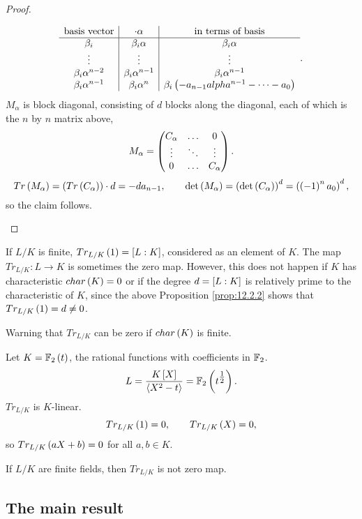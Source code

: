 \begin{proof}
\begin{itemize}
$$
\begin{array}{c|c|c}
\text{basis vector} & \cdot \alpha & \text{in terms of basis} \\
\hline
\beta_i & \beta_i\alpha & \beta_i\alpha \\
\vdots & \vdots & \vdots \\
\beta_i\alpha^{n - 2} & \beta_i\alpha^{n - 1} & \beta_i\alpha^{n - 1} \\
\beta_i\alpha^{n - 1} & \beta_i\alpha^n & \beta_i\rb{-a_{n - 1}alpha^{n - 1} - \dots - a_0} \\
\end{array}.
$$
$ M_\alpha $ is block diagonal, consisting of $ d $ blocks along the diagonal, each of which is the $ n $ by $ n $ matrix above,
$$ M_\alpha = \threebythree{C_\alpha}{\dots}{0}{\vdots}{\ddots}{\vdots}{0}{\dots}{C_\alpha}. $$
$$ Tr\rb{M_\alpha} = \rb{Tr\rb{C_\alpha}} \cdot d = -da_{n - 1}, \qquad \det\rb{M_\alpha} = \rb{\det\rb{C_\alpha}}^d = \rb{\rb{-1}^na_0}^d, $$
so the claim follows.
\end{itemize}
\end{proof}

\begin{remark}
If $ L / K $ is finite, $ Tr_{L / K}\rb{1} = \sb{L : K} $, considered as an element of $ K $. The map $ Tr_{L / K} : L \to K $ is sometimes the zero map. However, this does not happen if $ K $ has characteristic $ char\rb{K} = 0 $ or if the degree $ d = \sb{L : K} $ is relatively prime to the characteristic of $ K $, since the above Proposition \ref{prop:12.2.2} shows that $ Tr_{L / K}\rb{1} = d \ne 0 $.
\end{remark}

Warning that $ Tr_{L / K} $ can be zero if $ char\rb{K} $ is finite.

\begin{example*}
Let $ K = \F_2\rb{t} $, the rational functions with coefficients in $ \F_2 $.
$$ L = \dfrac{K\sb{X}}{\ab{X^2 - t}} = \F_2\rb{t^{\tfrac{1}{2}}}. $$
$ Tr_{L / K} $ is $ K $-linear.
$$ Tr_{L / K}\rb{1} = 0, \qquad Tr_{L / K}\rb{X} = 0, $$
so $ Tr_{L / K}\rb{aX + b} = 0 $ for all $ a, b \in K $.
\end{example*}

\begin{proposition}
If $ L / K $ are finite fields, then $ Tr_{L / K} $ is not zero map.
\end{proposition}

\subsection{The main result}

